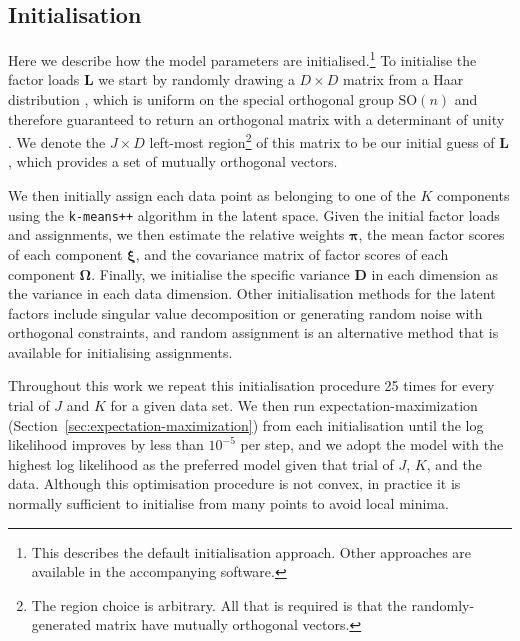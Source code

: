 \documentclass[twocolumn]{aastex62}
\newcommand{\vect}[1]{\boldsymbol{\mathbf{#1}}}
\renewcommand{\vec}[1]{\vect{#1}}
\newcommand{\factorloads}{\textbf{L}}
\newcommand{\specificvariance}{\vec{D}}
\newcommand{\scoremeans}{\vec\xi}
\newcommand{\scorecovs}{\vec\Omega}
\newcommand{\NumDimensions}{D}
\newcommand{\NumLatentFactors}{J}
\newcommand{\NumComponents}{K}
\begin{document}
\subsection{Initialisation} \label{sec:initialisation}

Here we describe how the model parameters are initialised.\footnote{This describes the default initialisation approach. Other approaches are available in the accompanying software.}
To initialise the factor loads $\factorloads$ we start by randomly drawing a $\NumDimensions \times \NumDimensions$ matrix from a Haar distribution \citep{Haar:1933},
which is uniform on the special orthogonal group $\textrm{SO}(n)$ and therefore guaranteed to return an orthogonal
matrix with a determinant of unity \citep{Stewart:1980}.
We denote the $\NumLatentFactors \times \NumDimensions$ left-most region\footnote{The region choice is arbitrary. All that is required is that the randomly-generated matrix have mutually orthogonal vectors.}
 of this
matrix to be our initial guess of $\factorloads$, which provides a set of mutually
orthogonal vectors.

We then initially assign each data point as belonging to one of the
$\NumComponents$ components using the \texttt{k-means++} algorithm \citep{Arthur:2007}
in the latent space. Given the initial
factor loads and assignments, we then estimate the relative weights
$\vec\pi$, the mean factor scores of each component $\scoremeans$, and
the covariance matrix of factor scores of each component $\scorecovs$.
Finally, we initialise the specific variance $\specificvariance$ in each
dimension as the variance in each data dimension. Other initialisation 
methods for the latent factors include singular value decomposition \citep{Golub:1970}
or generating random noise with orthogonal constraints, and random assignment
is an alternative method that is available for initialising assignments.

Throughout this work we repeat this initialisation procedure 25 times for
every trial of $\NumLatentFactors$ and $\NumComponents$ for a given data set. 
We then run expectation-maximization (Section~\ref{sec:expectation-maximization})
from each initialisation until the log likelihood improves by less than $10^{-5}$
per step, and we adopt the model with the highest log likelihood as the preferred 
model given that trial of $\NumLatentFactors$, $\NumComponents$, and the data. Although
this optimisation procedure is not convex, in practice it is normally sufficient to
initialise from many points to avoid local minima.
\end{document}
